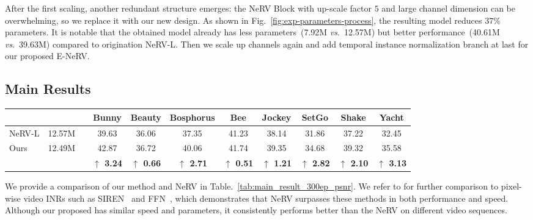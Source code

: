 \documentclass[runningheads]{llncs}
\begin{document}
After the first scaling, another redundant structure emerges: the NeRV Block with up-scale factor $5$ and large channel dimension can be overwhelming, so we replace it with our new design. As shown in Fig.~\ref{fig:exp-parameters-process}, the resulting model reduces $37\%$ parameters. It is notable that the obtained model already has less parameters~(7.92M \emph{vs}.\ 12.57M) but better performance~(40.61M \emph{vs}.\ 39.63M) compared to origination NeRV-L. Then we scale up channels again and add temporal instance normalization branch at last for our proposed E-NeRV.


\subsection{Main Results}
\begin{table*}[t]
    \centering
    \setlength{\tabcolsep}{0.7mm}
     \caption{PSNR~(larger the better) comparison between NeRV-L and our method given similar model size under the same training schedule. The last row indicates performance improvement brought by our method. Our method consistently outperforms the baseline model on diverse kinds of video sequences.}
    \begin{tabular}{llccccccccc}
    \toprule
     {} & {} & & Bunny & Beauty & Bosphorus & Bee & Jockey & SetGo & Shake & Yacht  \\
     \midrule
     NeRV-L& 12.57M & & 39.63 & 36.06 & 37.35 & 41.23 & 38.14 & 31.86 & 37.22 & 32.45 \\
     \midrule
     \multirow{2}{*}{Ours} & \multirow{2}{*}{12.49M} & & 42.87 & 36.72 & 40.06 & 41.74 & 39.35 & 34.68 & 39.32 & 35.58 \\
     \cmidrule{4-11}
     {} & {} & & \textbf{$\uparrow$ 3.24} & \textbf{$\uparrow$ 0.66} & \textbf{$\uparrow$ 2.71} & \textbf{$\uparrow$ 0.51} & \textbf{$\uparrow$ 1.21} & \textbf{$\uparrow$ 2.82} & \textbf{$\uparrow$ 2.10} & \textbf{$\uparrow$ 3.13} \\
     \bottomrule
     
\end{tabular}
    \label{tab:main_result_300ep_psnr}
\end{table*}

We provide a comparison of our method and NeRV in Table.~\ref{tab:main_result_300ep_psnr}. We refer to \cite{chen2021nerv} for further comparison to pixel-wise video INRs such as SIREN~\cite{sitzmann2020implicit} and FFN~\cite{mildenhall2020nerf}, which demonstrates that NeRV surpasses these methods in both performance and speed. Although our proposed \netname has similar speed and parameters, it consistently performs better than the NeRV on different video sequences.
\end{document}
